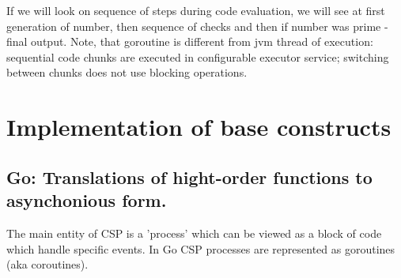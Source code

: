 \documentclass[12pt]{article}
\begin{document}
  If we will look on sequence of steps during code evaluation, we will see at first generation of
number, then sequence of checks and then if number was prime - final output.  Note, that goroutine is different from jvm thread of execution: sequential code chunks are executed in configurable executor service; switching between chunks does not use blocking operations.

\section{Implementation of base constructs }


\subsection{Go: Translations of hight-order functions to asynchonious form.}

 The main entity of CSP is a 'process' which can be viewed as a block of code which handle specific events.  In Go CSP processes are represented as goroutines (aka coroutines). 
\end{document}
